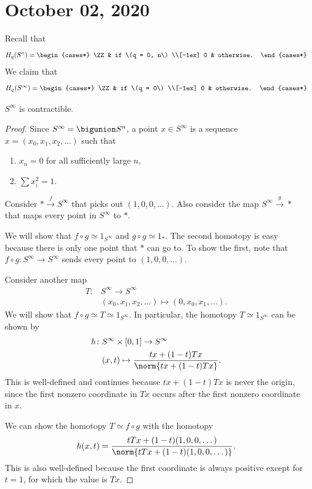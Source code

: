 \documentclass{standalone}
\begin{document}
\chapter{October 02, 2020}

Recall that
\[
  H_q(S^n) = \begin{cases*}
    \ZZ & if \(q = 0, n\) \\[-1ex]
    0 & otherwise.
  \end{cases*}
\]
We claim that
\[
  H_q(S^\infty) = \begin{cases*}
    \ZZ & if \(q = 0\) \\[-1ex]
    0 & otherwise.
  \end{cases*}
\]

\begin{proposition}
  \(S^\infty\) is contractible.
\end{proposition}
\begin{proof}
  Since \(S^\infty = \bigunion S^n\),
  a point \(x \in S^\infty\) is a sequence
  \(x = (x_0, x_1, x_2, \dots)\) such that
  \begin{enumerate}[nosep]
    \item \(x_n = 0\) for all sufficiently large \(n\),
    \item \(\sum x_i^2 = 1\).
  \end{enumerate}
  Consider \(* \overset{f}\to S^\infty\)
  that picks out \((1, 0, 0, \dots)\).
  Also consider the map \(S^\infty \overset{g}\to *\)
  that maps every point in \(S^\infty\) to \(*\).

  We will show that \(f \circ g \simeq 1_{S^\infty}\)
  and \(g \circ g \simeq 1_{*}\).
  The second homotopy is easy because there
  is only one point that \(*\) can go to.
  To show the first, note that
  \(f \circ g \colon S^\infty \to S^\infty\)
  sends every point to \((1, 0, 0, \dots)\).

  Consider another map
  \begin{align*}
    T \colon& S^\infty \to S^\infty \\
      & (x_0, x_1, x_2, \dots) \mapsto (0, x_0, x_1, \dots).
  \end{align*}
  We will show that \(f \circ g \simeq T \simeq 1_{S^\infty}\).
  In particular, the homotopy \(T \simeq 1_{S^\infty}\) can be shown by
  \begin{align*}
    h \colon& S^\infty \times [0, 1] \to S^\infty \\
      & (x, t) \mapsto \frac{t x + (1-t) T x}{\norm{t x + (1-t) T x}}.
  \end{align*}
  This is well-defined and continues because \(t x + (1-t) T x\)
  is never the origin, since the first nonzero coordinate in \(T x\)
  occurs after the first nonzero coordinate in \(x\).

  We can show the homotopy \(T \simeq f \circ g\) with the homotopy
  \[
    h(x, t) = \frac{t T x + (1 - t)(1, 0, 0, \dots)}
                   {\norm{t T x + (1 - t)(1, 0, 0, \dots)}}.
  \]
  This is also well-defined because the first coordinate is always positive
  except for \(t = 1\), for which the value is \(T x\).
\end{proof}
\end{document}
